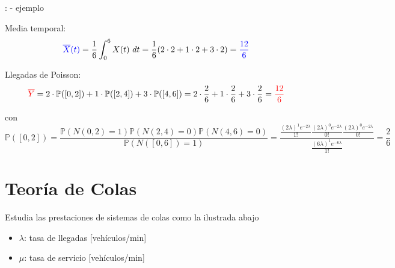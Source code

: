 \documentclass{beamer}
\newcommand{\red}[1]{{\color{red}#1}}
\newcommand{\blue}[1]{{\color{blue}#1}}
\begin{document}
\begin{frame}{\secname: \subsecname - ejemplo}

    Media temporal: 
    \begin{equation*}
        \blue{\overline{X}(t)}=\frac{1}{6}\int_0^6 X(t)\ dt =\frac{1}{6} (2\cdot2 + 1\cdot2 + 3\cdot2) = \blue{\frac{12}{6}}
    \end{equation*}

    Llegadas de Poisson:
    \begin{equation*}
        \red{\overline{Y}} = 2\cdot\mathbb{P}([0,2]) + 1 \cdot\mathbb{P}([2,4]) + 3\cdot \mathbb{P}([4,6])=2\cdot\frac{2}{6} + 1 \cdot\frac{2}{6}+ 3\cdot\frac{2}{6}=\red{\frac{12}{6}}
    \end{equation*}

    \vfill

    \begin{figure}
        \resizebox{.4\textwidth}{!}{%
        }
    \end{figure}

    \vfill

    con
    \begin{equation*}%
        \scriptstyle
        \mathbb{P}([0,2])=\frac{\mathbb{P}(N(0,2)=1)\mathbb{P}(N(2,4)=0)\mathbb{P}(N(4,6)=0)}{\mathbb{P}(N([0,6])=1)}
                          =\frac{\frac{(2\lambda)^1e^{-2\lambda}}{1!} \frac{(2\lambda)^0e^{-2\lambda}}{0!} \frac{(2\lambda)^0e^{-2\lambda}}{0!} }{\frac{(6\lambda)^1e^{-6\lambda}}{1!}}=\frac{2}{6}%
    \end{equation*}%
\end{frame}



\section{Teoría de Colas}



\begin{frame}{\secname}
    Estudia las prestaciones de sistemas
    de colas como la ilustrada abajo

    \begin{figure}
        
    \end{figure}

    \begin{itemize}
        \item $\lambda$: tasa de llegadas
            [vehículos/min]
        \item $\mu$: tasa de servicio
            [vehículos/min]
    \end{itemize}
\end{frame}
\end{document}
